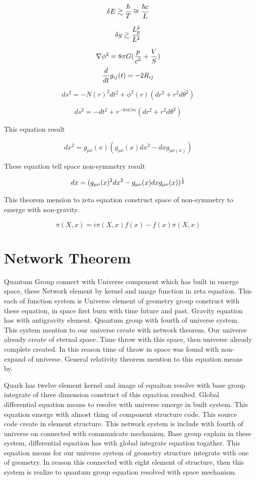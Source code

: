 \documentclass{jsarticle}
\begin{document}
  $$ \delta E \gtrsim {\hbar \over T} \cong {\hbar c \over L} $$

  $$ \delta g \gtrsim {L^2_{p} \over L^2} $$

  $$ \nabla \phi^2 = 8 \pi G({p \over c^3} + {V \over S}) $$
  $$ {d \over dt} g_{ij}(t) = - 2 R_{ij} $$

  $$ ds^2 = - N(r)^2dt^2 + \phi^2 (r)(dr^2 + r^2 d \theta^2) $$

  $$ ds^2 = -dt^2+ r^{-8 \pi G m} (dr^2 + r^2 d \theta^2) $$

  This equation result

  $$ dx^2 = g_{\mu\nu}(x)(g_{\mu\nu} (x)dx^2 - dxg_{\mu\nu (x)}) $$

  These equation tell space non-symmetry result

  $$ dx = (g_{\mu\nu} (x)^2 dx^2 - g_{\mu\nu} (x) dx g_{\mu\nu} (x))^{1 \over 2} $$

  This theorem mension to zeta equation construct space of non-symmetry to emerge with non-gravity.

  $$ \pi (X, x) = i \pi (X, x) f(x) - f(x) \pi (X, x) $$

  \section{Network Theorem}

    Quantum Group connect with Universe component which has built in emerge space, these Network element by
kernel and image function in zeta equation. This each of function system is Universe element of geometry group
construct with these equation, in space first burn with time future and past. Gravity equation has with
antigravity element. Quantum group with fourth of universe system. This system mention to our universe create
with network theorem. Our universe already create of eternal space. Time throw with this space, then universe
already complete created. In this reason time of throw in space was found with non-expand of universe.
General relativity theorem mention to this equation means by.

   Quark has twelve element kernel and image of equaiton resolve with base group integrate of three dimension
construct of this equation resulted. Global differential equation means to resolve with universe emerge in
built system. This equation emerge with almost thing of component structure code. This source code create in
element structure. This network system is include with fourth of universe on connected with communicate mechanism.
Base group explain in these system, differential equation has with global integrate equation togather. This equation
means for our universe system of geometry structure integrate with one of geometry. In reason this connected with
eight element of structure, then this system is realize to quantum group equation resolved with space mechanism.
\end{document}
